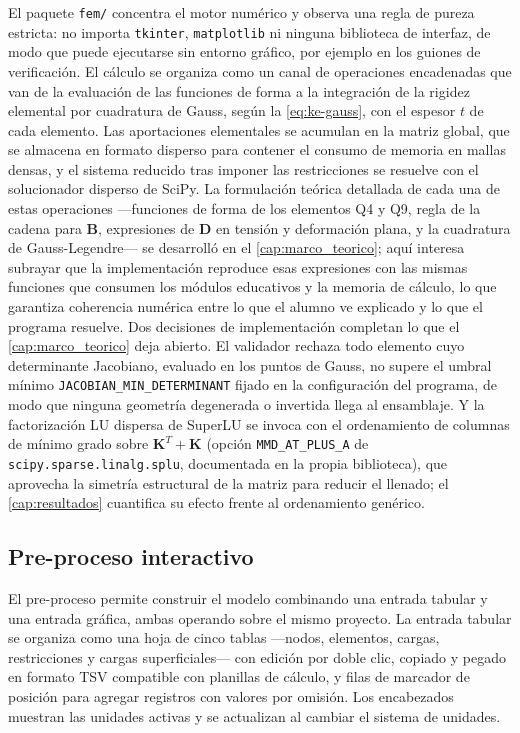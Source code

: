 El paquete \texttt{fem/} concentra el motor numérico y observa una regla de pureza estricta: no importa \texttt{tkinter}, \texttt{matplotlib} ni ninguna biblioteca de interfaz, de modo que puede ejecutarse sin entorno gráfico, por ejemplo en los guiones de verificación. El cálculo se organiza como un canal de operaciones encadenadas que van de la evaluación de las funciones de forma a la integración de la rigidez elemental por cuadratura de Gauss, según la \autoref{eq:ke-gauss}, con el espesor $t$ de cada elemento. Las aportaciones elementales se acumulan en la matriz global, que se almacena en formato disperso para contener el consumo de memoria en mallas densas, y el sistema reducido tras imponer las restricciones se resuelve con el solucionador disperso de SciPy. La formulación teórica detallada de cada una de estas operaciones —funciones de forma de los elementos Q4 y Q9, regla de la cadena para $\bm{B}$, expresiones de $\bm{D}$ en tensión y deformación plana, y la cuadratura de Gauss-Legendre— se desarrolló en el \autoref{cap:marco_teorico}; aquí interesa subrayar que la implementación reproduce esas expresiones con las mismas funciones que consumen los módulos educativos y la memoria de cálculo, lo que garantiza coherencia numérica entre lo que el alumno ve explicado y lo que el programa resuelve. Dos decisiones de implementación completan lo que el \autoref{cap:marco_teorico} deja abierto. El validador rechaza todo elemento cuyo determinante Jacobiano, evaluado en los puntos de Gauss, no supere el umbral mínimo \texttt{JACOBIAN\_MIN\_DETERMINANT} fijado en la configuración del programa, de modo que ninguna geometría degenerada o invertida llega al ensamblaje. Y la factorización LU dispersa de SuperLU se invoca con el ordenamiento de columnas de mínimo grado sobre $\bm{K}^{T}+\bm{K}$ (opción \texttt{MMD\_AT\_PLUS\_A} de \texttt{scipy.sparse.linalg.splu}, documentada en la propia biblioteca), que aprovecha la simetría estructural de la matriz para reducir el llenado; el \autoref{cap:resultados} cuantifica su efecto frente al ordenamiento genérico.

\subsection{Pre-proceso interactivo}
\label{sec:pre-proceso}

El pre-proceso permite construir el modelo combinando una entrada tabular y una entrada gráfica, ambas operando sobre el mismo proyecto. La entrada tabular se organiza como una hoja de cinco tablas —nodos, elementos, cargas, restricciones y cargas superficiales— con edición por doble clic, copiado y pegado en formato TSV compatible con planillas de cálculo, y filas de marcador de posición para agregar registros con valores por omisión. Los encabezados muestran las unidades activas y se actualizan al cambiar el sistema de unidades.

